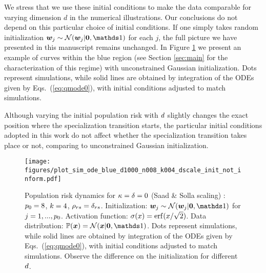 We stress that we use these initial conditions to make the data comparable for varying dimension $d$ in the numerical illustrations. Our conclusions do not depend on this particular choice of initial conditions. If one simply takes random initialization $ \w_j \sim \gauss  (\w_j |\bm{0},\Id ) $ for each $j$, the full picture we have presented in this manuscript remains unchanged. In Figure \ref{fig:plot_d_init_not_inf} we present an example of curves within the blue region (see Section \ref{sec:main} for the characterization of this regime) with unconstrained Gaussian initialization. Dots represent simulations, while solid lines are obtained by integration of the ODEs given by Eqs.~(\ref{eq:qmode0}), with initial conditions adjusted to match simulations.

Although varying the initial population risk with $d$ slightly changes the exact position where the specialization transition starts, the particular initial conditions adopted in this work do not affect whether the specialization transition takes place or not, comparing to unconstrained Gaussian initialization.


\begin{figure}[H]
\begin{center}
\centerline{\texttt{[image: figures/plot\_sim\_ode\_blue\_d1000\_n008\_k004\_dscale\_init\_not\_inform.pdf]}}
\caption{Population risk dynamics for $\kappa=\delta=0$ (Saad \& Solla scaling) : $p_0 = 8$, $k=4$, $\rho_{rs} = \delta_{rs}$. Initialization: $ \w_j \sim \gauss  (\w_j |\bm{0},\Id ) $ for $j = 1, ..., p_0$. Activation function: $\act(x) = \erf(x/\sqrt{2})$. Data distribution: $\Prob (\x) =  \gauss(\x | \bm{0}, \Id )$. Dots represent simulations, while solid lines are obtained by integration of the ODEs given by Eqs.~(\ref{eq:qmode0}), with initial conditions adjusted to match simulations. Observe the difference on the initialization for different $d$.}
\label{fig:plot_d_init_not_inf}
\end{center}
\vskip -0.2in
\end{figure}


